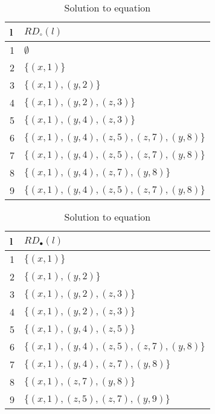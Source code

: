 \begin{table}
	\begin{tabular}{| l | l |}
	  \hline
	  l & $RD_\circ(l)$ \\
	  \hline
	  \hline
	1 & $\emptyset$\\
	2 & $\{(x,1)\}$\\
	3 & $\{(x,1),(y,2)\}$\\
	4 & $\{(x,1),(y,2),(z,3)\}$\\
	5 & $\{(x,1),(y,4),(z,3)\}$\\
	6 & $\{(x,1),(y,4),(z,5),(z,7),(y,8)\}$\\
	7 & $\{(x,1),(y,4),(z,5),(z,7),(y,8)\}$\\
	8 & $\{(x,1),(y,4),(z,7),(y,8)\}$\\
	9 & $\{(x,1),(y,4),(z,5),(z,7),(y,8)\}$\\
	  \hline
	\end{tabular}
    \centering
    \caption{Solution to equation}
    \label{table:solution1}
\end{table}

\begin{table}
	\begin{tabular}{| l | l |}
	  \hline
	  l & $RD_\bullet(l)$ \\
	  \hline
	  \hline
	1 & $\{(x,1)\}$\\
	2 & $\{(x,1),(y,2)\}$\\
	3 & $\{(x,1),(y,2),(z,3)\}$\\
	4 & $\{(x,1),(y,2),(z,3)\}$\\
	5 & $\{(x,1),(y,4),(z,5)\}$\\
	6 & $\{(x,1),(y,4),(z,5),(z,7),(y,8)\}$\\
	7 & $\{(x,1),(y,4),(z,7),(y,8)\}$\\
	8 & $\{(x,1),(z,7),(y,8)\}$\\
	9 & $\{(x,1),(z,5),(z,7),(y,9)\}$\\
	  \hline
	\end{tabular}
    \centering
	\caption{Solution to equation}
	\label{table:solution2}
\end{table}

